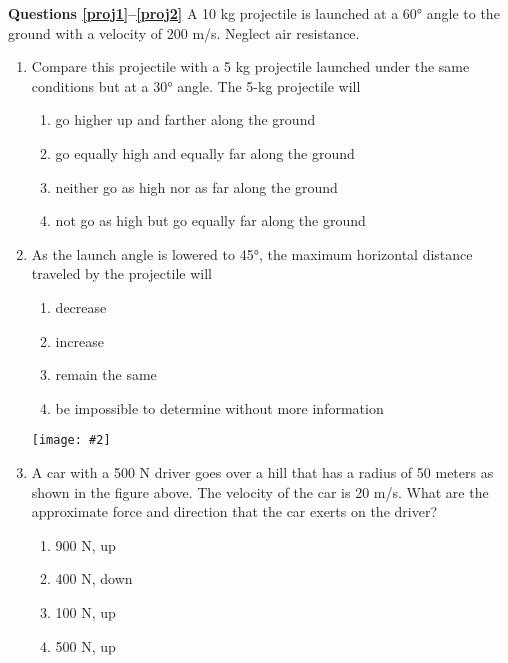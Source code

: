 \documentclass[11pt]{article}
\newcommand{\pic}[2]{\texttt{[image: \#2]}}
\begin{document}
\raggedcolumns
\begin{multicols}{2}
  \textbf{Questions \ref{proj1}--\ref{proj2}} A 10 kg projectile is launched at
  a \ang{60} angle to the ground with a velocity of 200 m/s. Neglect air
  resistance.
  \begin{enumerate}[leftmargin=18pt]
  \item Compare this projectile with a 5 kg projectile launched under the same
    conditions but at a \ang{30} angle. The 5-kg projectile will
    \label{proj1}
    \begin{enumerate}[nosep,leftmargin=18pt,label=(\Alph*)]
    \item go higher up and farther along the ground
    \item go equally high and equally far along the ground
    \item neither go as high nor as far along the ground
    \item not go as high but go equally far along the ground
    \end{enumerate}
    \vspace{.7in}
    
  \item As the launch angle is lowered to \ang{45}, the maximum horizontal
    distance traveled by the projectile will
    \label{proj2}
    \begin{enumerate}[nosep,leftmargin=18pt,label=(\Alph*)]
    \item decrease
    \item increase
    \item remain the same
    \item be impossible to determine without more information
    \end{enumerate}
    \vspace{.7in}
    
    \begin{center}
      \pic{.3}{IMG_20200810_093039201}
    \end{center}
  \item A car with a 500 N driver goes over a hill that has a radius of 50
    meters as shown in the figure above. The velocity of the car is 20 m/s.
    What are the approximate force and direction that the car exerts on the
    driver?
    \begin{enumerate}[nosep,leftmargin=18pt,label=(\Alph*)]
    \item 900 N, up
    \item 400 N, down
    \item 100 N, up
    \item 500 N, up
    \end{enumerate}
    

\end{enumerate}
\end{multicols}
\end{document}

